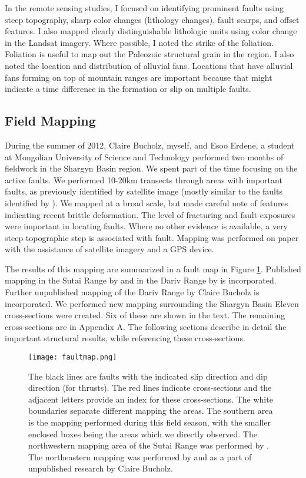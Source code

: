 In the remote sensing studies, I focused on identifying prominent faults using steep topography, sharp color changes (lithology changes), fault scarps, and offset features. I also mapped clearly distinguishable lithologic units using color change in the Landsat imagery. Where possible, I noted the strike of the foliation. Foliation is useful to map out the Paleozoic structural grain in the region. I also noted the location and distribution of alluvial fans. Locations that have alluvial fans forming on top of mountain ranges are important because that might indicate a time difference in the formation or slip on multiple faults.

\subsection{Field Mapping}
During the summer of 2012, Claire Bucholz, myself, and Esoo Erdene, a student at Mongolian University of Science and Technology performed two months of fieldwork in the Shargyn Basin region. We spent part of the time focusing on the active faults. We performed 10-20km transects through areas with important faults, as previously identified by satellite image (mostly similar to the faults identified by \citep{Walker2007}). We mapped at a broad scale, but made careful note of features indicating recent brittle deformation. The level of fracturing and fault exposures were important in locating faults. Where no other evidence is available, a very steep topographic step is associated with fault. Mapping was performed on paper with the assistance of satellite imagery and a GPS device. 

The results of this mapping are summarized in a fault map in Figure \ref{faultmap}. Published mapping in the Sutai Range by \citet{Cunningham2003} and in the Dariv Range by \citet{Dijkstra2006} is incorporated. Further unpublished mapping of the Dariv Range by Claire Bucholz is incorporated. We performed new mapping surrounding the Shargyn Basin Eleven cross-sections were created. Six of these are shown in the text. The remaining cross-sections are in Appendix A. The following sections describe in detail the important structural results, while referencing these cross-sections.
 
\begin{figure}[h!]
  \centering
  \texttt{[image: faultmap.png]}
  \caption{The black lines are faults with the indicated slip direction and dip direction (for thrusts). The red lines indicate cross-sections and the adjacent letters provide an index for these cross-sections. The white boundaries separate different mapping the areas. The southern area is the mapping performed during this field season, with the smaller enclosed boxes being the areas which we directly observed. The northwestern mapping area of the Sutai Range was performed by \citet{Cunningham2003}. The northeastern mapping was performed by \citet{Dijkstra2006} and as a part of unpublished research by Claire Bucholz.}
  \label{faultmap}
\end{figure}

